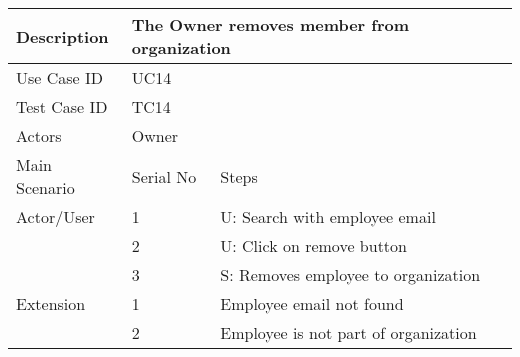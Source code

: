 \begin{table}[]
    \centering
    \begin{tabular}{|l|llll|}
        \hline
        Description   & \multicolumn{4}{l|}{The Owner removes  member from organization}                                                             \\ \hline
        Use Case ID   & \multicolumn{4}{l|}{UC14}                                                                                                    \\ \hline
        Test Case ID  & \multicolumn{4}{l|}{TC14}                                                                                                    \\ \hline
        Actors        & \multicolumn{4}{l|}{Owner}                                                                                                   \\ \hline
        Main Scenario & \multicolumn{1}{l|}{Serial No}                                   & \multicolumn{3}{l|}{Steps}                                \\ \hline
        Actor/User    & \multicolumn{1}{l|}{1}                                           & \multicolumn{3}{l|}{U: Search with employee email}        \\ \hline
                      & \multicolumn{1}{l|}{2}                                           & \multicolumn{3}{l|}{U: Click on remove button}            \\ \hline
                      & \multicolumn{1}{l|}{3}                                           & \multicolumn{3}{l|}{S: Removes employee to organization}  \\ \hline
        Extension     & \multicolumn{1}{l|}{1}                                           & \multicolumn{3}{l|}{Employee email not found}             \\ \hline
                      & \multicolumn{1}{l|}{2}                                           & \multicolumn{3}{l|}{Employee is not part of organization} \\ \hline
    \end{tabular}
\end{table}

